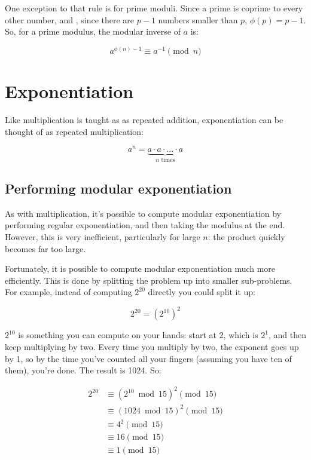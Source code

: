\documentclass[11pt,ebook,table,dvipsnames]{memoir}
\begin{document}
One exception to that rule is for prime moduli. Since a prime is
coprime to every other number, and , since there are $p - 1$ numbers
smaller than $p$, $\phi(p) = p - 1$. So, for a prime modulus, the
modular inverse of $a$ is:

\[
a^{\phi(n) - 1} \equiv a^{-1} \pmod n
\]
\section{Exponentiation}
\label{sec-4-1-5}

Like multiplication is taught as as repeated addition, exponentiation
can be thought of as repeated multiplication:

\[
a^n = \underbrace{a \cdot a \cdot \ldots \cdot a}_{n \text{ times}}
\]

\subsection{Performing modular exponentiation}
\label{sec-4-1-5-1}

As with multiplication, it's possible to compute modular
exponentiation by performing regular exponentiation, and then taking
the modulus at the end. However, this is very inefficient,
particularly for large $n$: the product quickly becomes far too large.

Fortunately, it is possible to compute modular exponentiation much
more efficiently. This is done by splitting the problem up into
smaller sub-problems. For example, instead of computing $2^{20}$
directly you could split it up:

\[
2^{20} = (2^{10})^2
\]

$2^{10}$ is something you can compute on your hands: start at 2, which
is $2^1$, and then keep multiplying by two. Every time you multiply by
two, the exponent goes up by 1, so by the time you've counted all your
fingers (assuming you have ten of them), you're done. The result
is 1024. So:

\begin{align*}
2^{20} &\equiv (2^{10} \bmod {15})^2 \pmod {15} \\
       &\equiv (1024 \bmod {15})^2   \pmod {15} \\
       &\equiv 4^2                   \pmod {15} \\
       &\equiv 16                    \pmod {15} \\
       &\equiv 1                     \pmod {15}
\end{align*}
\end{document}
